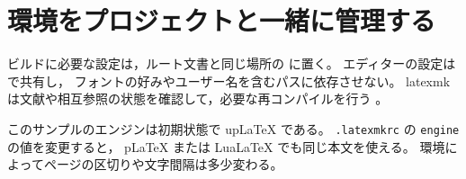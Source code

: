 \section{環境をプロジェクトと一緒に管理する}
ビルドに必要な設定は，ルート文書と同じ場所の
 に置く。
エディターの設定は  で共有し，
フォントの好みやユーザー名を含むパスに依存させない。
latexmk は文献や相互参照の状態を確認して，必要な再コンパイルを行う
\cite{latexmk}。

このサンプルのエンジンは初期状態で upLaTeX である。
\texttt{.latexmkrc} の \texttt{engine} の値を変更すると，
pLaTeX または LuaLaTeX でも同じ本文を使える。
環境によってページの区切りや文字間隔は多少変わる。
